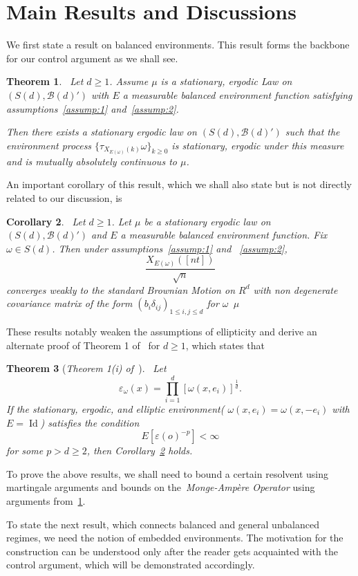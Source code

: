 \documentclass[final]{aomart}
\def\mathscr#1{#1}%
\def\mathbb#1{#1}%
\theoremstyle{plain}
\newtheorem{theorem}{Theorem}[section]
\newtheorem{corollary}[theorem]{Corollary}
\theoremstyle{definition}
\theoremstyle{remark}
\begin{document}
\section{Main Results and Discussions}
We first state a result on balanced environments. This result forms the backbone for our control argument as we shall see.
\begin{theorem}~\label{Lawler}
Let $d\geq 1$. Assume $\mu$ is a stationary, ergodic Law on $(\mathscr{S}(d), \mathcal{B}(d)')$ with $\mathscr{E}$ a measurable balanced environment function satisfying assumptions~\ref{assump:1} and~\ref{assump:2}.

Then there exists a stationary ergodic law on $(\mathscr{S}(d), \mathcal{B}(d)')$ such that the environment process $\{\tau_{X_{\mathscr{E}(\omega)}(k)} \omega \}_{k \geq 0}$ is stationary, ergodic under this measure and is mutually absolutely continuous to $\mu$.
\end{theorem}
An important corollary of this result, which we shall also state but is not directly related to our discussion, is 
\begin{corollary}~\label{QIP}
Let $d\geq1$. Let $\mu$ be a stationary ergodic law on $(\mathscr{S}(d), \mathcal{B}(d)')$ and $\mathscr{E}$ a measurable balanced environment function. Fix $\omega \in \mathscr{S}(d)$. Then under assumptions~\ref{assump:1} and ~\ref{assump:2}, \[
\frac{X_{\mathscr{E}(\omega)}([nt])}{\sqrt{n}}
\]
converges weakly to the standard Brownian Motion on $\mathbb{R}^d$ with non degenerate covariance matrix of the form $(b_i \delta_{ij})_{1\leq i,j\leq d } $ for $\omega$~$\mu$ 
\end{corollary}
These results notably weaken the assumptions of ellipticity and derive an alternate proof of Theorem 1 of~\cite{guo2012quenched} for $d \geq 1$, which states that 
\begin{theorem}[\textit{Theorem 1(i) of~\cite{guo2012quenched}}]~\label{Easy}
Let \[
\varepsilon_\omega(x) = \prod_{i=1}^{d} [\omega(x,e_i)]^{\frac{1}{d}}. 
\] If the stationary, ergodic, and elliptic environment( $\omega(x,e_i) = \omega(x,-e_i)$ with $\mathscr{E}= \operatorname{Id}$) satisfies the condition \[
\mathbb{E}[\varepsilon(o)^{-p}] <\infty
\] for some $p >d \geq 2 $, then Corollary~\ref{QIP} holds. 
\end{theorem}
To prove the above results, we shall need to bound a certain resolvent using martingale arguments and bounds on the~\textit{Monge-Ampère Operator} using arguments from~\ref{Lawler}. 

To state the next result, which connects balanced and general unbalanced regimes, we need the notion of embedded environments. The motivation for the construction can be understood only after the reader gets acquainted with the control argument, which will be demonstrated accordingly. 
\end{document}
